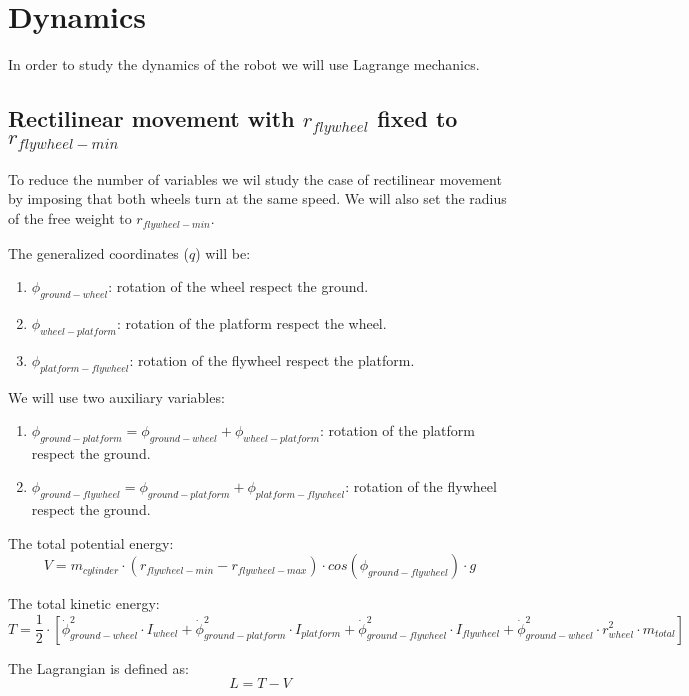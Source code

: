\section{Dynamics}

In order to study the dynamics of the robot we will use Lagrange mechanics.

\subsection{Rectilinear movement with $r_{flywheel}$ fixed to $r_{flywheel-min}$}
To reduce the number of variables we wil study the case of rectilinear
movement by imposing that both wheels turn at the same speed. We will also set
the radius of the free weight to $r_{flywheel-min}$.

The generalized coordinates ($q$) will be:
\begin{enumerate}
	\item $\phi_{ground-wheel}$: rotation of the wheel respect the ground.
	\item $\phi_{wheel-platform}$: rotation of the platform respect the wheel.
	\item $\phi_{platform-flywheel}$: rotation of the flywheel respect the platform.
\end{enumerate}

We will use two auxiliary variables:
\begin{enumerate}
	\item $\phi_{ground-platform}=\phi_{ground-wheel}+\phi_{wheel-platform}$: rotation of the platform respect the ground.
	\item $\phi_{ground-flywheel}=\phi_{ground-platform}+\phi_{platform-flywheel}$: rotation of the flywheel respect the ground.
\end{enumerate}

The total potential energy:
\begin{equation}
	V = m_{cylinder}\cdot (r_{flywheel-min}-r_{flywheel-max}) \cdot cos(\phi_{ground-flywheel}) \cdot g	
\end{equation}


The total kinetic energy:
\begin{equation}
	T = \frac{1}{2}\cdot[\dot{\phi}_{ground-wheel}^2\cdot I_{wheel}
	+ \dot{\phi}_{ground-platform}^2 \cdot I_{platform}
	+ \dot{\phi}_{ground-flywheel}^2\cdot I_{flywheel}
	+ \dot{\phi}_{ground-wheel}^2\cdot r_{wheel}^2\cdot m_{total}]	
\end{equation}

The Lagrangian is defined as:
\begin{equation}
	L=T-V	
\end{equation}

